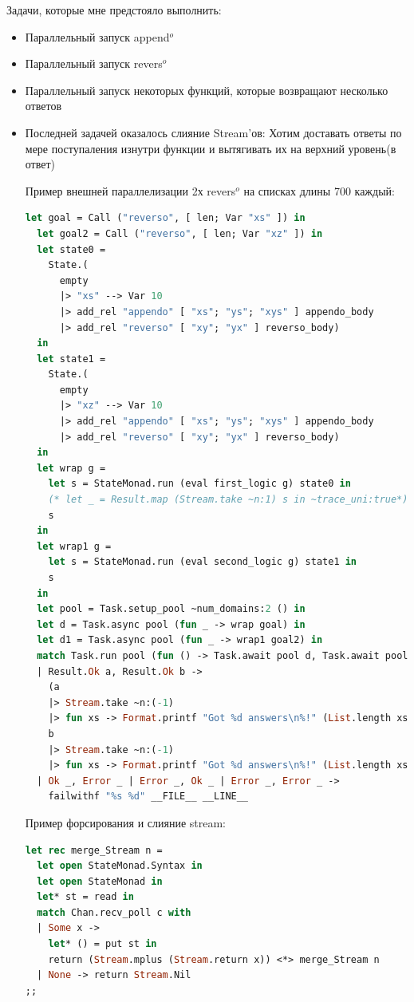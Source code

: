 Задачи, которые мне предстояло выполнить:
\begin{itemize}
  \item Параллельный запуск append$^o$
\item Параллельный запуск revers$^o$ 
\item Параллельный запуск некоторых функций, которые возвращают
несколько ответов
\item Последней задачей оказалось слияние Stream’ов: Хотим доставать
ответы по мере поступаления изнутри функции и вытягивать их на
верхний уровень(в ответ)

Пример внешней параллелизации 2х revers$^o$ на списках длины 700 каждый:

\begin{lstlisting}[caption=parallel_revers$^o$, language=OCaml, frame=single]
  let goal = Call ("reverso", [ len; Var "xs" ]) in
  let goal2 = Call ("reverso", [ len; Var "xz" ]) in
  let state0 =
    State.(
      empty
      |> "xs" --> Var 10
      |> add_rel "appendo" [ "xs"; "ys"; "xys" ] appendo_body
      |> add_rel "reverso" [ "xy"; "yx" ] reverso_body)
  in
  let state1 =
    State.(
      empty
      |> "xz" --> Var 10
      |> add_rel "appendo" [ "xs"; "ys"; "xys" ] appendo_body
      |> add_rel "reverso" [ "xy"; "yx" ] reverso_body)
  in
  let wrap g =
    let s = StateMonad.run (eval first_logic g) state0 in
    (* let _ = Result.map (Stream.take ~n:1) s in ~trace_uni:true*)
    s
  in
  let wrap1 g =
    let s = StateMonad.run (eval second_logic g) state1 in
    s
  in
  let pool = Task.setup_pool ~num_domains:2 () in
  let d = Task.async pool (fun _ -> wrap goal) in
  let d1 = Task.async pool (fun _ -> wrap1 goal2) in
  match Task.run pool (fun () -> Task.await pool d, Task.await pool d1) with
  | Result.Ok a, Result.Ok b ->
    (a
    |> Stream.take ~n:(-1)
    |> fun xs -> Format.printf "Got %d answers\n%!" (List.length xs));
    b
    |> Stream.take ~n:(-1)
    |> fun xs -> Format.printf "Got %d answers\n%!" (List.length xs)
  | Ok _, Error _ | Error _, Ok _ | Error _, Error _ ->
    failwithf "%s %d" __FILE__ __LINE__
\end{lstlisting}

Пример форсирования и слияние stream:

\begin{lstlisting}[caption=merge_stream, language=OCaml, frame=single]
  let rec merge_Stream n =
  let open StateMonad.Syntax in
  let open StateMonad in
  let* st = read in
  match Chan.recv_poll c with
  | Some x ->
    let* () = put st in
    return (Stream.mplus (Stream.return x)) <*> merge_Stream n
  | None -> return Stream.Nil
;;


\end{lstlisting}
\end{itemize}
